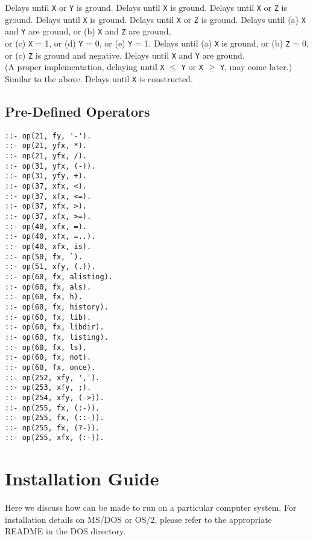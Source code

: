 \begin{description}
	Delays until {\tt X} or {\tt Y} is ground.
	Delays until {\tt X} is ground.
\chgbarbegin
{}
	Delays until {\tt X} or {\tt Z} is ground.
\chgbarend
{}
	Delays until {\tt X} is ground.
\chgbarbegin
{}
	Delays until {\tt X} or {\tt Z} is ground.
\chgbarend
{}
	Delays until (a) {\tt X} and {\tt Y} are ground, or 
	(b) {\tt X} and {\tt Z} are ground, \\
	or (c) {\tt X} = 1, or (d) {\tt Y} = 0, or (e) {\tt Y} = 1.
	Delays until (a) {\tt X} is ground, or (b) {\tt Z} = 0, or (c) {\tt Z} is ground
	and negative.
	Delays until {\tt X} and {\tt Y} are ground.\\
	(A proper implementation, delaying until {\tt X} $\leq$ {\tt Y} 
    or {\tt X} $\geq$ {\tt Y},
	may come later.)
	Similar to the above.
	Delays until {\tt X} is constructed.
\end{description}

\section{Pre-Defined Operators}
\label{op-section}
\begin{verbatim}
::- op(21, fy, '-').
::- op(21, yfx, *).
::- op(21, yfx, /).
::- op(31, yfx, (-)).
::- op(31, yfy, +).
::- op(37, xfx, <).
::- op(37, xfx, <=).
::- op(37, xfx, >).
::- op(37, xfx, >=).
::- op(40, xfx, =).
::- op(40, xfx, =..).
::- op(40, xfx, is).
::- op(50, fx, `).
::- op(51, xfy, (.)).
::- op(60, fx, alisting).
::- op(60, fx, als).
::- op(60, fx, h).
::- op(60, fx, history).
::- op(60, fx, lib).
::- op(60, fx, libdir).
::- op(60, fx, listing).
::- op(60, fx, ls).
::- op(60, fx, not).
::- op(60, fx, once).
::- op(252, xfy, ',').
::- op(253, xfy, ;).
::- op(254, xfy, (->)).
::- op(255, fx, (:-)).
::- op(255, fx, (::-)).
::- op(255, fx, (?-)).
::- op(255, xfx, (:-)).
\end{verbatim}

\chapter{Installation Guide}
\label{installation-guide}

Here we discuss how \CLPR{} can be made to run on a particular computer system.
\chgbarbegin
For installation details on MS/DOS or OS/2, please refer to the
appropriate README in the DOS directory.
\chgbarend

